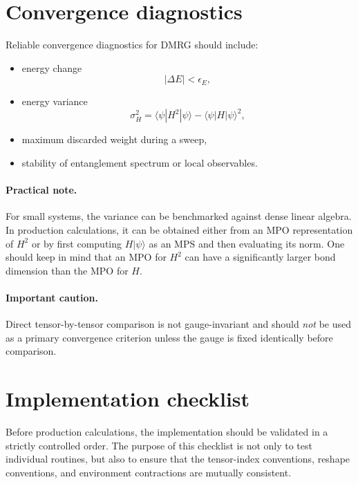 \documentclass[aps,prb,onecolumn,nofootinbib]{revtex4-2}
\newcommand{\ket}[1]{|#1\rangle}
\newcommand{\bra}[1]{\langle #1|}
\newcommand{\eps}{\epsilon}
\begin{document}
	\section{Convergence diagnostics}
	
	Reliable convergence diagnostics for DMRG should include:
	\begin{itemize}
		\item energy change
		\[
		|\Delta E| < \eps_E,
		\]
		\item energy variance
		\[
		\sigma_H^2 = \bra{\psi}H^2\ket{\psi} - \bra{\psi}H\ket{\psi}^2,
		\]
		\item maximum discarded weight during a sweep,
		\item stability of entanglement spectrum or local observables.
	\end{itemize}
	
	\paragraph{Practical note.}
	For small systems, the variance can be benchmarked against dense linear algebra. In production calculations, it can be obtained either from an MPO representation of $H^2$ or by first computing $H\ket{\psi}$ as an MPS and then evaluating its norm. One should keep in mind that an MPO for $H^2$ can have a significantly larger bond dimension than the MPO for $H$.
	
	\paragraph{Important caution.}
	Direct tensor-by-tensor comparison is not gauge-invariant and should \emph{not} be used as a primary convergence criterion unless the gauge is fixed identically before comparison.
	
	\section{Implementation checklist}
	
	Before production calculations, the implementation should be validated in a strictly
	controlled order. The purpose of this checklist is not only to test individual routines,
	but also to ensure that the tensor-index conventions, reshape conventions, and environment
	contractions are mutually consistent.
	
\end{document}
